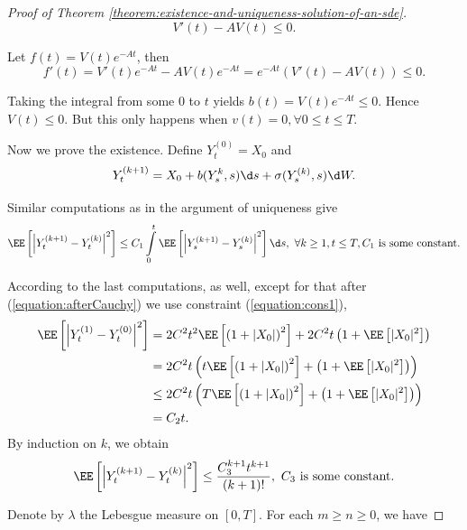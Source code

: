 \begin{proof}[Proof of Theorem \ref{theorem:existence-and-uniqueness-solution-of-an-sde}]
  $$V'(t)-AV(t)\le0.$$

  Let $f(t)=V(t)e^{-At}$, then
  $$f'(t)=V'(t)e^{-At} - AV(t)e^{-At}=e^{-At}(V'(t)-AV(t))\le0.$$

  Taking the integral from some $0$ to $t$ yields $b(t)=V(t)e^{-At}\le 0.$ Hence $V(t)\le 0$. But this only happens when $v(t)=0,\forall 0\le t\le T$.

  Now we prove the existence. Define $Y_t^{(0)}=X_0$ and
  $$Y_t^{(k+1)} = X_0+b(Y_s^k,s)\d s+\sigma(Y_s^{(k)},s)\d W.$$

  Similar computations as in the argument of uniqueness give
  $$\EE\left[\left|Y_t^{(k+1)}-Y_t^{(k)}\right|^2\right]\le C_1\int\limits_0^t \EE\left[\left|Y_s^{(k+1)}-Y_s^{(k)}\right|^2\right]\d s,\,\,\forall k\ge 1, t\le T, C_1 \text{ is some constant}.$$

  According to the last computations, as well, except for that after (\ref{equation:afterCauchy}) we use constraint (\ref{equation:cons1}),
  \begin{align*}
    \EE\left[\left|Y_t^{(1)}-Y_t^{(0)}\right|^2\right]
     & = 2C^2t^2\EE\left[\left(1+|X_0|\right)^2\right]+2C^2t\left(1+\EE\left[|X_0|^2\right]\right)          \\
     & = 2C^2t\left(t\EE\left[\left(1+|X_0|\right)^2\right]+\left(1+\EE\left[|X_0|^2\right]\right)\right)   \\
     & \le 2C^2t\left(T\EE\left[\left(1+|X_0|\right)^2\right]+\left(1+\EE\left[|X_0|^2\right]\right)\right) \\
     & =C_2t.
  \end{align*}
  By induction on $k$, we obtain
  \begin{equation}
    \label{equation:upperY}
    \EE\left[\left|Y_t^{(k+1)}-Y_t^{(k)}\right|^2\right]\le\dfrac{C_3^{k+1}t^{k+1}}{(k+1)!}, \,\, C_3 \text{ is some constant}.
  \end{equation}

  Denote by $\lambda$ the Lebesgue measure on $[0,T]$. For each $m\ge n\ge 0$, we have


\end{proof}
